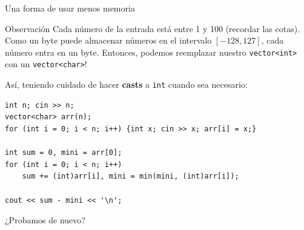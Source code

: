 \documentclass{beamer}
\begin{document}
    \begin{frame}[fragile]{Una forma de usar menos memoria}
        \begin{block}{Observación}
            \pause
            Cada número de la entrada está entre 1 y 100 (recordar las cotas). \pause Como un byte puede almacenar números en el intervalo $[-128, 127]$, cada número entra en un byte. \pause Entonces, podemos reemplazar nuestro \texttt{vector<int>} con un \texttt{vector<char>}!
        \end{block} \pause

        Así, teniendo cuidado de hacer \textbf{casts} a \texttt{int} cuando sea necesario: \pause

        \begin{verbatim}
int n; cin >> n;
vector<char> arr(n);
for (int i = 0; i < n; i++) {int x; cin >> x; arr[i] = x;}

int sum = 0, mini = arr[0];
for (int i = 0; i < n; i++)
    sum += (int)arr[i], mini = min(mini, (int)arr[i]);

cout << sum - mini << '\n';
        \end{verbatim}

        \begin{center}
            \LARGE
            ¿Probamos de nuevo?
        \end{center}
    \end{frame}
\end{document}

